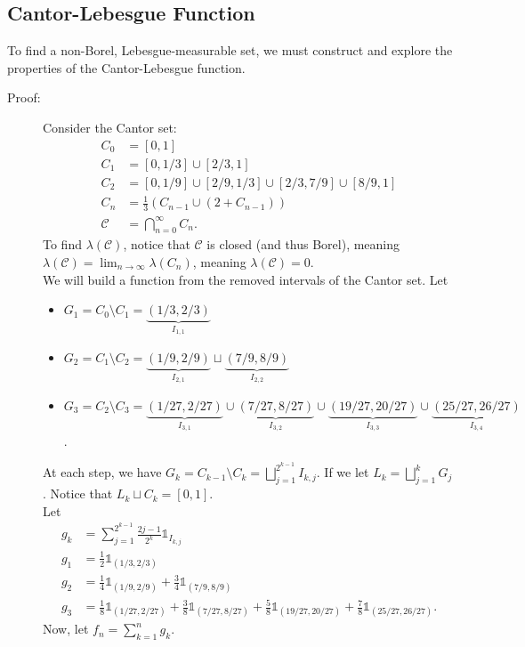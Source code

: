 \documentclass[9pt]{extarticle}
\begin{document}
  \subsection{Cantor-Lebesgue Function}%
  To find a non-Borel, Lebesgue-measurable set, we must construct and explore the properties of the Cantor-Lebesgue function.
  \begin{description}
    \item[Proof:] Consider the Cantor set:
      \begin{align*}
        C_0 &= [0,1]\\
        C_1 &= [0,1/3]\cup[2/3,1]\\
        C_2 &= [0,1/9]\cup[2/9,1/3]\cup[2/3,7/9]\cup[8/9,1]\\
        C_n &= \frac{1}{3}\left(C_{n-1}\cup (2 + C_{n-1})\right)\\
        \mathcal{C} &= \bigcap_{n=0}^{\infty} C_n.
      \end{align*}
      To find $\lambda(\mathcal{C})$, notice that $\mathcal{C}$ is closed (and thus Borel), meaning $\lambda(\mathcal{C}) = \lim_{n\rightarrow\infty} \lambda(C_n)$, meaning $\lambda(\mathcal{C}) = 0$.\\

      We will build a function from the removed intervals of the Cantor set. Let
      \begin{itemize}
        \item $\displaystyle G_1 = C_0 \setminus C_1 = \underbrace{(1/3,2/3)}_{I_{1,1}}$
        \item $\displaystyle G_2 = C_1 \setminus C_2 = \underbrace{(1/9,2/9)}_{I_{2,1}}\sqcup\underbrace{(7/9,8/9)}_{I_{2,2}}$
        \item $\displaystyle G_3 = C_2\setminus C_3 = \underbrace{(1/27,2/27)}_{I_{3,1}}\cup\underbrace{(7/27,8/27)}_{I_{3,2}}\cup\underbrace{(19/27,20/27)}_{I_{3,3}}\cup\underbrace{(25/27,26/27)}_{I_{3,4}}$.
      \end{itemize}
      At each step, we have $G_{k} = C_{k-1}\setminus C_k = \bigsqcup_{j=1}^{2^{k-1}}I_{k,j}$. If we let $L_k = \bigsqcup_{j=1}^{k}G_j$. Notice that $L_k\sqcup C_k = [0,1]$.\\

      Let
      \begin{align*}
        g_k &= \sum_{j=1}^{2^{k-1}}\frac{2j-1}{2^k}\mathbb{1}_{I_{k,j}}\\
        g_1 &= \frac{1}{2}\mathbb{1}_{(1/3,2/3)}\\
        g_2 &= \frac{1}{4}\mathbb{1}_{(1/9,2/9)} + \frac{3}{4}\mathbb{1}_{(7/9,8/9)}\\
        g_3 &= \frac{1}{8}\mathbb{1}_{(1/27,2/27)} + \frac{3}{8}\mathbb{1}_{(7/27,8/27)} + \frac{5}{8}\mathbb{1}_{(19/27,20/27)} + \frac{7}{8}\mathbb{1}_{(25/27,26/27)}.
      \end{align*}
      Now, let $f_n = \sum_{k=1}^{n}g_k$.\\


\end{description}
\end{document}
